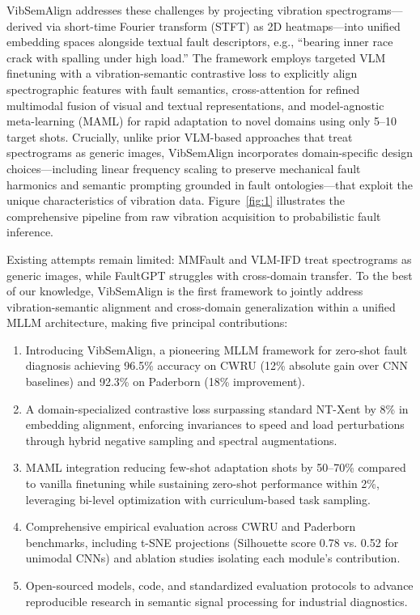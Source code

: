 VibSemAlign addresses these challenges by projecting vibration spectrograms---derived via short-time Fourier transform (STFT) as 2D heatmaps---into unified embedding spaces alongside textual fault descriptors, e.g., ``bearing inner race crack with spalling under high load.'' The framework employs targeted VLM finetuning with a vibration-semantic contrastive loss to explicitly align spectrographic features with fault semantics, cross-attention for refined multimodal fusion of visual and textual representations, and model-agnostic meta-learning (MAML) for rapid adaptation to novel domains using only 5--10 target shots. Crucially, unlike prior VLM-based approaches that treat spectrograms as generic images, VibSemAlign incorporates domain-specific design choices---including linear frequency scaling to preserve mechanical fault harmonics and semantic prompting grounded in fault ontologies---that exploit the unique characteristics of vibration data. Figure~\ref{fig:1} illustrates the comprehensive pipeline from raw vibration acquisition to probabilistic fault inference.

Existing attempts remain limited: MMFault \cite{cite23} and VLM-IFD \cite{cite24} treat spectrograms as generic images, while FaultGPT \cite{cite26} struggles with cross-domain transfer. To the best of our knowledge, VibSemAlign is the first framework to jointly address vibration-semantic alignment and cross-domain generalization within a unified MLLM architecture, making five principal contributions:
\begin{enumerate}
\item Introducing VibSemAlign, a pioneering MLLM framework for zero-shot fault diagnosis achieving 96.5\% accuracy on CWRU (12\% absolute gain over CNN baselines) and 92.3\% on Paderborn (18\% improvement).
\item A domain-specialized contrastive loss surpassing standard NT-Xent by 8\% in embedding alignment, enforcing invariances to speed and load perturbations through hybrid negative sampling and spectral augmentations.
\item MAML integration reducing few-shot adaptation shots by 50--70\% compared to vanilla finetuning while sustaining zero-shot performance within 2\%, leveraging bi-level optimization with curriculum-based task sampling.
\item Comprehensive empirical evaluation across CWRU and Paderborn benchmarks, including t-SNE projections (Silhouette score 0.78 vs. 0.52 for unimodal CNNs) and ablation studies isolating each module's contribution.
\item Open-sourced models, code, and standardized evaluation protocols to advance reproducible research in semantic signal processing for industrial diagnostics.
\end{enumerate}

